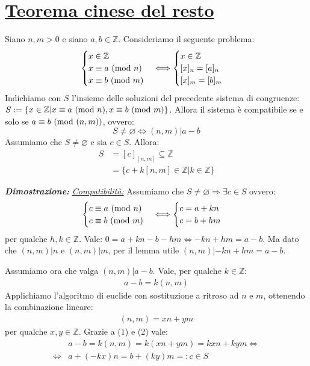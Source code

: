 \documentclass[oneside]{book}
\begin{document}
\section{\underline{Teorema cinese del resto}}
\begin{tcolorbox}[enhanced, breakable, title={Teolema cinese del lesto}]
Siano $n,m>0$ e siano $a,b \in \mathbb{Z}$. Consideriamo il seguente problema:
\[
    \begin{cases}
        x \in \mathbb{Z}\\
        x \equiv a \ (\mathrm{mod}\ n)\\
        x \equiv b \ (\mathrm{mod}\ m)
    \end{cases}
    \Longleftrightarrow
    \begin{cases}
        x \in \mathbb{Z}\\
        [x]_n = [a]_n\\
        [x]_m = [b]_m
    \end{cases}
\]
Indichiamo con $S$ l'insieme delle soluzioni del precedente sistema di congruenze:
$S:=\{ x \in \mathbb{Z}| x \equiv a \ (\mathrm{mod}\ n), x \equiv b \ (\mathrm{mod}\ m) \}$.
Allora il sistema è compatibile se e solo se $a \equiv b \ (\mathrm{mod}\ (n,m))$, ovvero:
\[ S\not = \varnothing \Longleftrightarrow (n,m)|a-b \]
Assumiamo che $S \not = \varnothing$ e sia $c\in S$. Allora:
\begin{align*}
    S &=[c]_{[n,m]} \subseteq \mathbb{Z}\\
    &=\{ c+k[n,m] \in \mathbb{Z}| k \in \mathbb{Z} \}
\end{align*}

\emph{\textbf{Dimostrazione:}} \underline{\emph{Compatibilità:}} Assumiamo che
$S \not = \varnothing \Rightarrow \exists c \in S$ ovvero:
\[
    \begin{cases}
        c \equiv a \ (\mathrm{mod}\ n)\\
        c \equiv b \ (\mathrm{mod}\ m)
    \end{cases}
    \Longleftrightarrow
    \begin{cases}
        c = a+kn\\
        c = b+hm
    \end{cases}
\]
per qualche $h,k \in \mathbb{Z}$. Vale: $ 0 = a+kn - b-hm \Leftrightarrow -kn+hm = a-b $.
Ma dato che $(n,m)|n$ e $(n,m)|m$, per il lemma utile $(n,m)|-kn+hm = a-b$.

Assumiamo ora che valga $(n,m)|a-b$. Vale, per qualche $k \in \mathbb{Z}$:
\begin{align}
    a-b = k(n,m)
\end{align}
Applichiamo l'algoritmo di euclide con sostituzione a ritroso ad $n$ e $m$, ottenendo la
combinazione lineare:
\begin{align}
    (n,m) = xn+ym
\end{align}
per qualche $x,y \in \mathbb{Z}$. Grazie a (1) e (2) vale:
\begin{align*}
    &a-b=k(n,m)=k(xn+ym)=kxn+kym \Leftrightarrow\\
    \Leftrightarrow &a+(-kx)n=b+(ky)m =: c \in S
\end{align*}


\end{tcolorbox}
\end{document}
